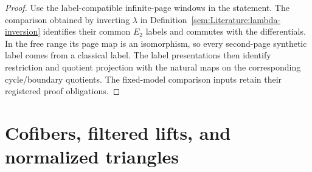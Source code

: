 \begin{proof}
Use the label-compatible infinite-page windows in the statement. The comparison obtained by inverting $\lambda$ in Definition~\ref{sem:Literature:lambda-inversion} identifies their common $E_2$ labels and commutes with the differentials. In the free range its page map is an isomorphism, so every second-page synthetic label comes from a classical label. The label presentations then identify restriction and quotient projection with the natural maps on the corresponding cycle/boundary quotients. The fixed-model comparison inputs retain their registered proof obligations.
\end{proof}

\section{Cofibers, filtered lifts, and normalized triangles}

